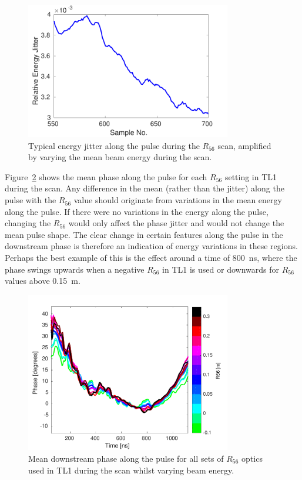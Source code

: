 \begin{figure}
  \centering
  \includegraphics[width=0.8\textwidth]{Figures/propagation/R56ScanGunWiggle_EnergyJitterAlong}
  \caption{Typical energy jitter along the pulse during the \(R_{56}\) scan, amplified by varying the mean beam energy during the scan.}
  \label{f:R56ScanGunWiggle_EnergyJitterAlong}
\end{figure}

Figure~\ref{f:r56Scan_meanPhaseAlong} shows the mean phase along the pulse for each \(R_{56}\) setting in TL1 during the scan. Any difference in the mean (rather than the jitter) along the pulse with the \(R_{56}\) value should originate from variations in the mean energy along the pulse. If there were no variations in the energy along the pulse, changing the \(R_{56}\) would only affect the phase jitter and would not change the mean pulse shape. The clear change in certain features along the pulse in the downstream phase is therefore an indication of energy variations in these regions. Perhaps the best example of this is the effect around a time of 800~ns, where the phase swings upwards when a negative \(R_{56}\) in TL1 is used or downwards for \(R_{56}\) values above 0.15~m.

\begin{figure}
  \centering
  \includegraphics[width=0.8\textwidth]{Figures/propagation/r56Scan_meanPhaseAlong}
  \caption{Mean downstream phase along the pulse for all sets of \(R_{56}\) optics used in TL1 during the scan whilst varying beam energy.}
  \label{f:r56Scan_meanPhaseAlong}
\end{figure}

